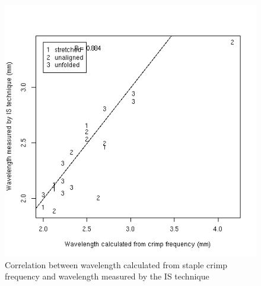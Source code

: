 %

\begin{figure}[!hb]
  \centering
  \includegraphics[width=1.0\textwidth]{figcrimpwavlis.png}
  \caption{Correlation between wavelength calculated from staple crimp frequency and wavelength measured by the IS technique}
  \label{fig:crimpwavlis}
\end{figure}

%

